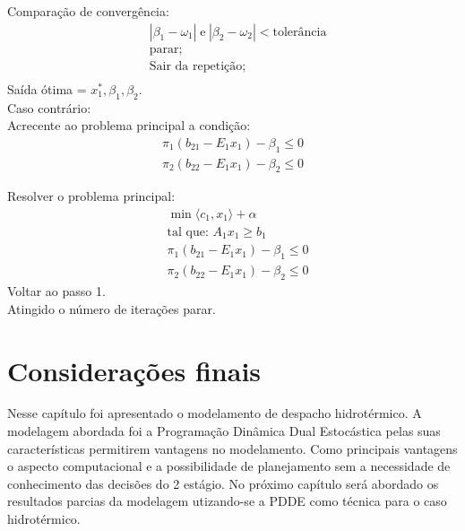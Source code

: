 Compara\c c\~ao de converg\^encia:
\begin{align*}
	&|\beta_1 - \omega_1|\hspace{3pt} \mbox{e} \hspace{3pt} |\beta_2 - \omega_2|< \mbox{toler\^ancia}\\
	&\mbox{parar;}\\
	&\mbox{Sair da repeti\c c\~ao;}\\
\end{align*}
Sa\'ida \'otima = $x_1^{*}, \beta_1, \beta_2.$ \\
Caso contr\'ario:\\

Acrecente ao problema principal a condi\c c\~ao:
\begin{align*}
	\pi_1(b_{21} - E_1x_1) - \beta_1 \leq 0\\
	\pi_2(b_{22} - E_1x_1) - \beta_2 \leq 0
\end{align*}

Resolver o problema principal:
\begin{align*}
&\min \langle c_1,x_1\rangle + \alpha \nonumber\\
&\mbox{tal que: }	A_1 x_1 \geq b_1\\
&\pi_1(b_{21} - E_1x_1) - \beta_1 \leq 0\\
&\pi_2(b_{22} - E_1x_1) - \beta_2 \leq 0
\end{align*}
Voltar ao passo 1.\\
Atingido o número de itera\c c\~oes parar.\\

\section{Considera\c c\~oes finais}
Nesse cap\'itulo foi apresentado o modelamento de despacho hidrot\'ermico. A modelagem abordada foi a Programa\c c\~ao
Din\^amica Dual Estoc\'astica pelas suas caracter\'isticas permitirem vantagens no modelamento. Como principais
vantagens o aspecto computacional e a possibilidade de planejamento sem a necessidade de conhecimento das decis\~oes do 2
est\'agio. No pr\'oximo cap\'itulo ser\'a abordado os resultados parcias da modelagem utizando-se a PDDE como t\'ecnica para o
caso hidrot\'ermico.

